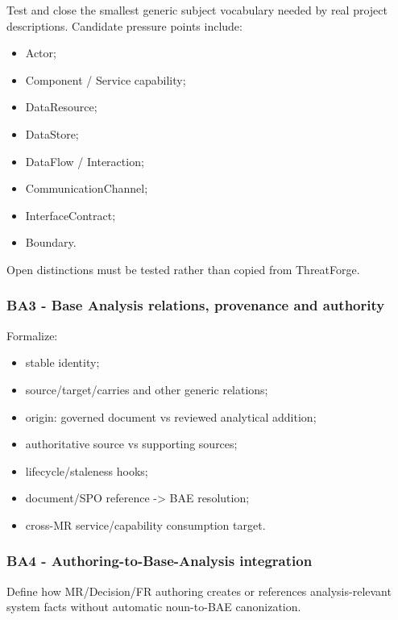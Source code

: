 \documentclass[
  11pt,
  a4paper,
]{article}
\providecommand{\tightlist}{%
  \setlength{\itemsep}{0pt}\setlength{\parskip}{0pt}}
\begin{document}
Test and close the smallest generic subject vocabulary needed by real
project descriptions. Candidate pressure points include:

\begin{itemize}
\tightlist
\item
  Actor;
\item
  Component / Service capability;
\item
  DataResource;
\item
  DataStore;
\item
  DataFlow / Interaction;
\item
  CommunicationChannel;
\item
  InterfaceContract;
\item
  Boundary.
\end{itemize}

Open distinctions must be tested rather than copied from ThreatForge.

\subsubsection{BA3 - Base Analysis relations, provenance and
authority}\label{ba3---base-analysis-relations-provenance-and-authority}

Formalize:

\begin{itemize}
\tightlist
\item
  stable identity;
\item
  source/target/carries and other generic relations;
\item
  origin: governed document vs reviewed analytical addition;
\item
  authoritative source vs supporting sources;
\item
  lifecycle/staleness hooks;
\item
  document/SPO reference -\textgreater{} BAE resolution;
\item
  cross-MR service/capability consumption target.
\end{itemize}

\subsubsection{BA4 - Authoring-to-Base-Analysis
integration}\label{ba4---authoring-to-base-analysis-integration}

Define how MR/Decision/FR authoring creates or references
analysis-relevant system facts without automatic noun-to-BAE
canonization.
\end{document}
